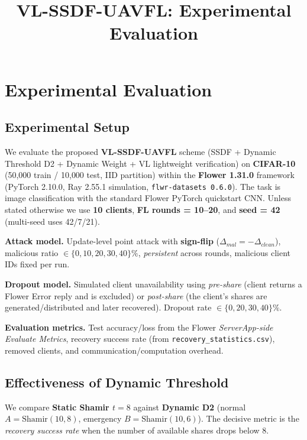 \documentclass[10pt,conference]{IEEEtran}
\title{VL-SSDF-UAVFL: Experimental Evaluation}
\author{}
\date{}
\begin{document}
\maketitle

\section{Experimental Evaluation}

\subsection{Experimental Setup}

We evaluate the proposed \textbf{VL-SSDF-UAVFL} scheme (SSDF + Dynamic Threshold D2 + Dynamic Weight + VL lightweight verification) on \textbf{CIFAR-10} (50{,}000 train / 10{,}000 test, IID partition) within the \textbf{Flower 1.31.0} framework (PyTorch 2.10.0, Ray 2.55.1 simulation, \texttt{flwr-datasets 0.6.0}). The task is image classification with the standard Flower PyTorch quickstart CNN. Unless stated otherwise we use \textbf{10 clients}, \textbf{FL rounds = 10--20}, and \textbf{seed = 42} (multi-seed uses 42/7/21).

\textbf{Attack model.} Update-level point attack with \textbf{sign-flip} ($\Delta_{mal}=-\Delta_{clean}$), malicious ratio $\in \{0,10,20,30,40\}\%$, \emph{persistent} across rounds, malicious client IDs fixed per run.

\textbf{Dropout model.} Simulated client unavailability using \emph{pre-share} (client returns a Flower Error reply and is excluded) or \emph{post-share} (the client's shares are generated/distributed and later recovered). Dropout rate $\in \{0,20,30,40\}\%$.

\textbf{Evaluation metrics.} Test accuracy/loss from the Flower \emph{ServerApp-side Evaluate Metrics}, recovery success rate (from \texttt{recovery\_statistics.csv}), removed clients, and communication/computation overhead.

\subsection{Effectiveness of Dynamic Threshold}

We compare \textbf{Static Shamir $t=8$} against \textbf{Dynamic D2} (normal $A=\mathrm{Shamir}(10,8)$, emergency $B=\mathrm{Shamir}(10,6)$). The decisive metric is the \emph{recovery success rate} when the number of available shares drops below 8.
\end{document}
